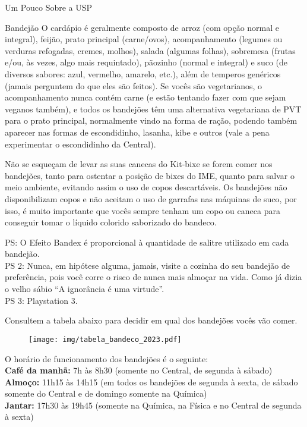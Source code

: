 \begin{secao}{Um Pouco Sobre a USP}
\begin{subsecao}{Bandejão}
O cardápio é geralmente composto de arroz (com opção normal e integral), feijão,
prato principal (carne/ovos), acompanhamento (legumes ou verduras refogadas,
cremes, molhos), salada (algumas folhas), sobremesa (frutas e/ou, às vezes, algo mais
requintado), pãozinho (normal e integral) e suco (de diversos sabores: azul, vermelho,
amarelo, etc.), além de temperos genéricos (jamais perguntem do que eles são feitos). 
Se vocês são vegetarianos, o acompanhamento nunca contém carne (e estão tentando 
fazer com que sejam veganos também), e todos os bandejões têm uma alternativa 
vegetariana de PVT para o prato principal, normalmente vindo na forma de ração,
podendo também aparecer nas formas de escondidinho, lasanha, kibe e outros
(vale a pena experimentar o escondidinho da Central).


Não se esqueçam de levar as suas canecas do Kit-bixe se forem comer nos
bandejões, tanto para ostentar a posição de bixes do IME, quanto para salvar o
meio ambiente, evitando assim o uso de copos descartáveis. Os bandejões não 
disponibilizam copos e não aceitam o uso de garrafas nas máquinas de suco, por 
isso, é muito importante que vocês sempre tenham um copo ou caneca para conseguir 
tomar o líquido colorido saborizado do bandeco.


PS: O Efeito Bandex é proporcional à quantidade de salitre utilizado em cada
bandejão.\\
PS 2: Nunca, em hipótese alguma, jamais, visite a cozinha do seu bandejão de
preferência, pois você corre o risco de nunca mais almoçar na vida. Como já
dizia o velho sábio ``A ignorância é uma virtude''.\\
PS 3: Playstation 3.

Consultem a tabela abaixo para decidir em qual dos bandejões vocês vão comer.

\begin{figure}[!htbp]
\begin{center}
 	\texttt{[image: img/tabela\_bandeco\_2023.pdf]}
\end{center}
\end{figure}


O horário de funcionamento dos bandejões é o seguinte:\\
\textbf{Café da manhã:} 7h às 8h30 (somente no Central, de segunda à sábado)\\
\textbf{Almoço:} 11h15 às 14h15 (em todos os bandejões de segunda à sexta, de sábado 
somente do Central e de domingo somente na Química)\\
\textbf{Jantar:} 17h30 às 19h45 (somente na Química, na Física e no Central de segunda à sexta)\\


\end{subsecao}
\end{secao}
